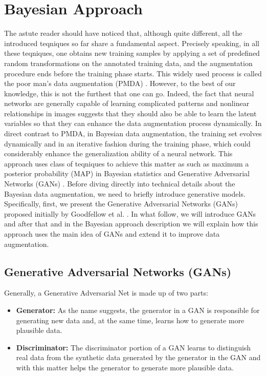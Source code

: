 \section{Bayesian Approach}
\label{tit:bayesian-approach}
The astute reader should have noticed that, although quite different, all the introduced teqniques so far share a fundamental aspect. Precisely speaking, in all these teqniques, one obtains new training samples by applying a set of predefined random transformations on the annotated training data, and the augmentation procedure ends before the training phase starts. This widely used process is called the poor man's data augmentation (PMDA) \cite{poor_man_data_augmentation}. However, to the best of our knowledge, this is not the furthest that one can go. Indeed, the fact that neural networks are generally capable of learning complicated patterns and nonlinear relationships in images suggests that they should also be able to learn the latent variables so that they can enhance the data augmentation process dynamically.
In direct contrast to PMDA, in Bayesian data augmentation, the training set evolves dynamically and
in an iterative fashion during the training phase, which could considerably enhance the
generalization ability of a neural network. This approach uses class of teqniques to achieve this
matter as such as maximum a posterior probability (MAP) \cite{MAP_Bayesian} in Bayesian statistics and Generative
Adversarial Networks (GANs) . Before diving directly into technical details about the
Bayesian data augmentation, we need to briefly introduce generative models. Specifically, first, we
present the Generative Adversarial Networks (GANs) proposed initially by Goodfellow et al.
\cite{goodflew_bayesian_approach}. In what follow, we
will introduce GANs and after that and in the Bayesian approach description we will explain how this
approach uses the main idea of GANs and extend it to improve data augmentation.

\subsection{Generative Adversarial Networks (GANs)}
\label{tit:Generative-Adversarial-Network}
Generally, a Generative Adversarial Net is made up of two parts:
\begin{itemize}
\item{\textbf{Generator:}} As the name suggests, the generator in a GAN is responsible for generating new data and, at the same time, learns how to generate more plausible data. 
\item{\textbf{Discriminator:}} The discriminator portion of a GAN learns to distinguish real data from the synthetic data generated 
by the generator in the GAN and with this matter helps the generator to generate more plausible data.
\end{itemize}


